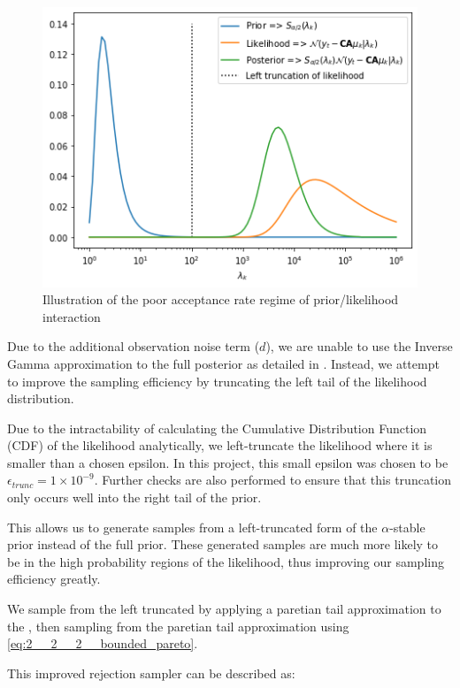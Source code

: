 \documentclass[../main.tex]{subfiles}
\begin{document}
\begin{figure}[h!]
	\centering
	\includegraphics[width=12.0cm]{../plots/2__2__2__rejection_sampling_priors.png}
	\caption{Illustration of the poor acceptance rate regime of prior/likelihood interaction}
	\label{fig:2__2__2__rejection_sampling_priors}
\end{figure}

Due to the additional observation noise term ($d$), we are unable to use the Inverse Gamma approximation to the full posterior as detailed in \cite{godsill1999bayesian}. Instead, we attempt to improve the sampling efficiency by truncating the left tail of the likelihood distribution. 

Due to the intractability of calculating the Cumulative Distribution Function (CDF) of the likelihood analytically, we left-truncate the likelihood where it is smaller than a chosen epsilon. In this project, this small epsilon was chosen to be $\epsilon_{trunc} = 1 \times 10^{-9}$. Further checks are also performed to ensure that this truncation only occurs well into the right tail of the prior. 

This allows us to generate samples from a left-truncated form of the $\alpha$-stable prior instead of the full prior. These generated samples are much more likely to be in the high probability regions of the likelihood, thus improving our sampling efficiency greatly.

We sample from the left truncated \asd  by applying a paretian tail approximation to the \asd, then sampling from the paretian tail approximation using \autoref{eq:2__2__2__bounded_pareto}.

This improved rejection sampler can be described as:
\end{document}
